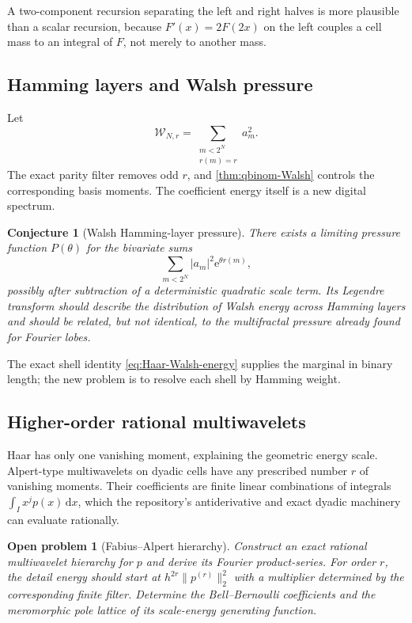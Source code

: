 \documentclass[11pt,oneside]{article}
\newtheorem{conjecture}[theorem]{Conjecture}
\newtheorem{openproblem}[theorem]{Open problem}
\theoremstyle{definition}
\theoremstyle{remark}
\newcommand{\e}{\mathrm e}
\newcommand{\dd}{\,\mathrm d}
\begin{document}
A two-component recursion separating the left and right halves is more
plausible than a scalar recursion, because $F'(x)=2F(2x)$ on the left couples a
cell mass to an integral of $F$, not merely to another mass.

\subsection{Hamming layers and Walsh pressure}

Let
\begin{equation}\label{eq:Walsh-layer-energy}
 \mathcal W_{N,r}=\sum_{\substack{m<2^N\\r(m)=r}}a_m^2.
\end{equation}
The exact parity filter removes odd $r$, and
\cref{thm:qbinom-Walsh} controls the corresponding basis moments.  The
coefficient energy itself is a new digital spectrum.

\begin{conjecture}[Walsh Hamming-layer pressure]
\label{conj:Walsh-pressure}
There exists a limiting pressure function $P(\theta)$ for the bivariate sums
\begin{equation}\label{eq:Walsh-pressure-sum}
 \sum_{m<2^N}|a_m|^2\e^{\theta r(m)},
\end{equation}
possibly after subtraction of a deterministic quadratic scale term.  Its
Legendre transform should describe the distribution of Walsh energy across
Hamming layers and should be related, but not identical, to the multifractal
pressure already found for Fourier lobes.
\end{conjecture}

The exact shell identity \eqref{eq:Haar-Walsh-energy} supplies the marginal in
binary length; the new problem is to resolve each shell by Hamming weight.

\subsection{Higher-order rational multiwavelets}

Haar has only one vanishing moment, explaining the geometric energy scale.
Alpert-type multiwavelets on dyadic cells have any prescribed number $r$ of
vanishing moments.  Their coefficients are finite linear combinations of
integrals $\int_Ix^jp(x)\dd x$, which the repository's antiderivative and exact
dyadic machinery can evaluate rationally.

\begin{openproblem}[Fabius--Alpert hierarchy]
\label{op:Alpert}
Construct an exact rational multiwavelet hierarchy for $p$ and derive its
Fourier product-series.  For order $r$, the detail energy should start at
$h^{2r}\|p^{(r)}\|_2^2$ with a multiplier determined by the corresponding
finite filter.  Determine the Bell--Bernoulli coefficients and the meromorphic
pole lattice of its scale-energy generating function.
\end{openproblem}
\end{document}
